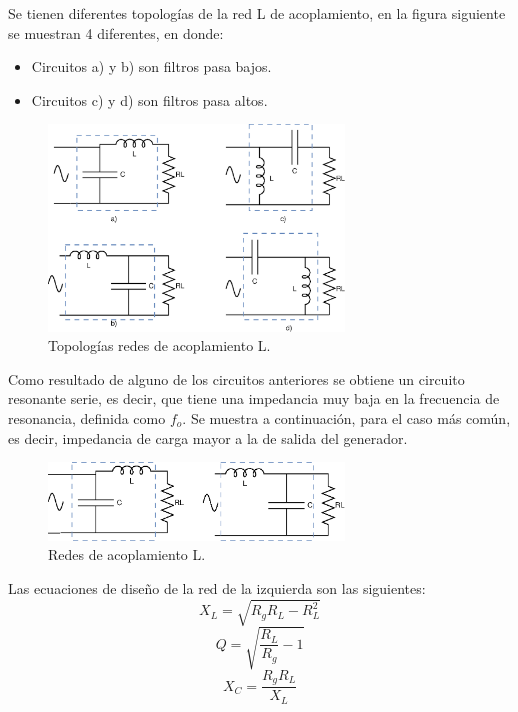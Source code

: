 \documentclass{article}
\begin{document}
Se tienen diferentes topologías de la red L de acoplamiento, en la figura siguiente se muestran 4 diferentes, en donde:
\begin{itemize}
    \item Circuitos a) y b) son filtros pasa bajos.
    \item Circuitos c) y d) son filtros pasa altos.
\end{itemize}
\begin{figure}[H]
\centering
\includegraphics[width=0.7\textwidth]{./img/figura6.eps}
\caption{Topologías redes de acoplamiento L.}
\label{fig:circuito6}
\end{figure}
\noindent Como resultado de alguno de los circuitos anteriores se obtiene un circuito resonante serie, es decir, que tiene una impedancia muy baja en la frecuencia de resonancia, definida como $f_o$.  Se muestra a continuación, para el caso más común, es decir, impedancia de carga mayor a la de salida del generador. 
\begin{figure}[H]
\centering
\includegraphics[width=0.7\textwidth]{./img/figura7.eps}
\caption{Redes de acoplamiento L.}
\label{fig:circuito7}
\end{figure}
\newpage
\noindent Las ecuaciones de diseño de la red de la izquierda son las siguientes:
\begin{equation*}
    X_L = \sqrt{R_gR_L - R_L^2}
\end{equation*}
\begin{equation*}
    Q = \sqrt{\frac{R_L}{R_g} - 1}
\end{equation*}
\begin{equation*}
    X_C = \frac{R_gR_L}{X_L}
\end{equation*}
\end{document}
